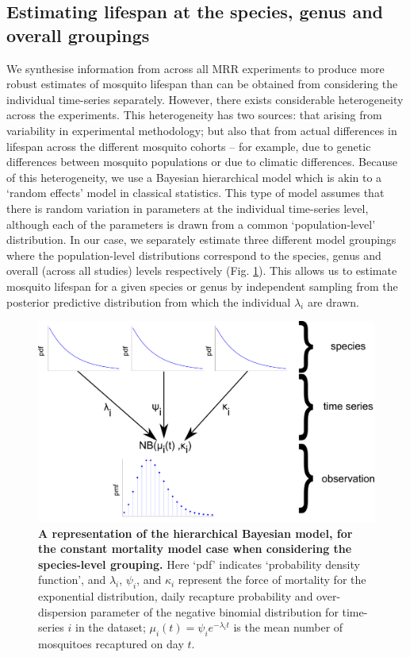 \documentclass[12pt]{article}
\begin{document}
\subsection{Estimating lifespan at the species, genus and overall groupings}\label{sec:MRR_hierarchical}
We synthesise information from across all MRR experiments to produce more robust estimates of mosquito lifespan than can be obtained from considering the individual time-series separately. However, there exists considerable heterogeneity across the experiments. This heterogeneity has two sources: that arising from variability in experimental methodology; but also that from actual differences in lifespan across the different mosquito cohorts -- for example, due to genetic differences between mosquito populations or due to climatic differences. Because of this heterogeneity, we use a Bayesian hierarchical model which is akin to a `random effects' model in classical statistics. This type of model assumes that there is random variation in parameters at the individual time-series level, although each of the parameters is drawn from a common `population-level' distribution. In our case, we separately estimate three different model groupings where the population-level distributions correspond to the species, genus and overall (across all studies) levels respectively (Fig. \ref{fig:mrr_methodDiagramHierarchy}). This allows us to estimate mosquito lifespan for a given species or genus by independent sampling from the posterior predictive distribution from which the individual $\lambda_i$ are drawn.


\begin{figure}[h]
	\centerline{\includegraphics[width=1\textwidth]{./Figure_files/mrr_methodDiagramHierarchy.pdf}}
	\caption{\textbf{A representation of the hierarchical Bayesian model, for the constant mortality model case when considering the species-level grouping.} Here `pdf' indicates `probability density function', and $\lambda_i$, $\psi_i$, and $\kappa_i$ represent the force of mortality for the exponential distribution, daily recapture probability and over-dispersion parameter of the negative binomial distribution for time-series $i$ in the dataset; $\mu_i(t)= \psi_i e^{-\lambda_i t}$ is the mean number of mosquitoes recaptured on day $t$.}
	\label{fig:mrr_methodDiagramHierarchy}
\end{figure}
\end{document}
